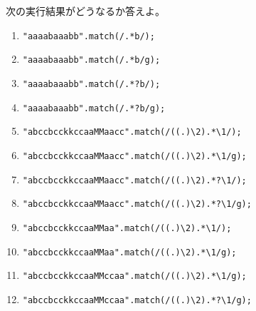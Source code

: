 \begin{Prob}\upshape
次の実行結果がどうなるか答えよ。
\begin{enumerate}
 \item \texttt{"aaaabaaabb".match(/.*b/);}
 \item \texttt{"aaaabaaabb".match(/.*b/g);}
 \item \texttt{"aaaabaaabb".match(/.*?b/);}
 \item \texttt{"aaaabaaabb".match(/.*?b/g);}
 \item \Verb+"abccbcckkccaaMMaacc".match(/((.)\2).*\1/);+
 \item \Verb+"abccbcckkccaaMMaacc".match(/((.)\2).*\1/g);+
 \item \Verb+"abccbcckkccaaMMaacc".match(/((.)\2).*?\1/);+
 \item \Verb+"abccbcckkccaaMMaacc".match(/((.)\2).*?\1/g);+
 \item \Verb+"abccbcckkccaaMMaa".match(/((.)\2).*\1/);+
 \item \Verb+"abccbcckkccaaMMaa".match(/((.)\2).*\1/g);+
 \item \Verb+"abccbcckkccaaMMccaa".match(/((.)\2).*\1/g);+
 \item \Verb+"abccbcckkccaaMMccaa".match(/((.)\2).*?\1/g);+
%
\end{enumerate}
\end{Prob}
\iffalse
"abccbcckkccaaMMaacc".match(/((.)\2).*\1/g);
["ccbcckkccaaMMaacc"]
"abccbcckkccaaMMaacc".match(/((.)\2).*?\1/g);
["ccbcc", "ccaaMMaacc"]
"abccbcckkccaaMMccaa".match(/((.)\2).*\1/g);
["ccbcckkccaaMMcc"]
"abccbcckkccaaMMccaa".match(/((.)\2).*?\1/g);
["ccbcc", "ccaaMMcc"]
\fi